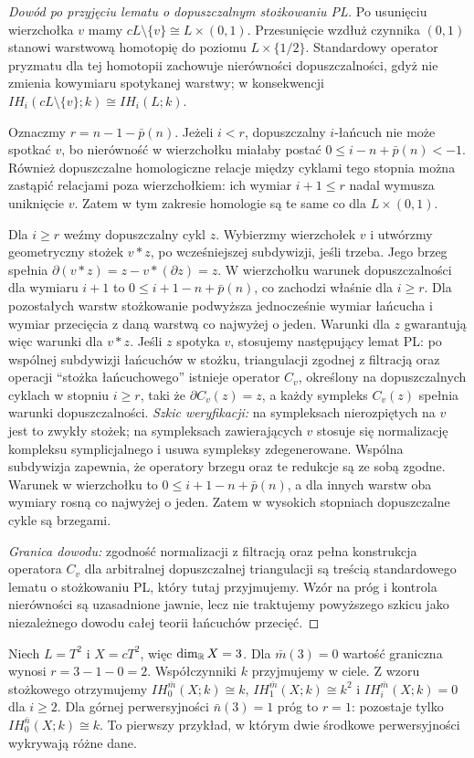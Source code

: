 \begin{proof}[Dowód po przyjęciu lematu o dopuszczalnym stożkowaniu PL]
Po usunięciu wierzchołka $v$ mamy
$cL\setminus\{v\}\cong L\times(0,1)$.
Przesunięcie wzdłuż czynnika $(0,1)$ stanowi
warstwową homotopię do poziomu $L\times\{1/2\}$.
Standardowy operator pryzmatu dla tej homotopii
zachowuje nierówności dopuszczalności, gdyż nie
zmienia kowymiaru spotykanej warstwy; w konsekwencji
$IH_i(cL\setminus\{v\};k)\cong IH_i(L;k)$.

Oznaczmy $r=n-1-\bar p(n)$.
Jeżeli $i<r$, dopuszczalny $i$-łańcuch nie może
spotkać $v$, bo nierówność w wierzchołku miałaby
postać $0\le i-n+\bar p(n)<-1$.
Również dopuszczalne homologiczne relacje między
cyklami tego stopnia można zastąpić relacjami poza
wierzchołkiem: ich wymiar $i+1\le r$ nadal wymusza
uniknięcie $v$. Zatem w tym zakresie homologie są
te same co dla $L\times(0,1)$.

Dla $i\ge r$ weźmy dopuszczalny cykl $z$.
Wybierzmy wierzchołek $v$ i utwórzmy geometryczny
stożek $v*z$, po wcześniejszej subdywizji, jeśli
trzeba. Jego brzeg spełnia
$\partial(v*z)=z-v*(\partial z)=z$.
W wierzchołku warunek dopuszczalności dla wymiaru
$i+1$ to $0\le i+1-n+\bar p(n)$, co zachodzi
właśnie dla $i\ge r$. Dla pozostałych warstw
stożkowanie podwyższa jednocześnie wymiar łańcucha
i wymiar przecięcia z daną warstwą co najwyżej
o jeden. Warunki dla $z$ gwarantują więc warunki
dla $v*z$. Jeśli $z$ spotyka $v$, stosujemy następujący
lemat PL: po wspólnej subdywizji łańcuchów w
stożku, triangulacji zgodnej z filtracją oraz
operacji ``stożka łańcuchowego'' istnieje operator
$C_v$, określony na dopuszczalnych cyklach w
stopniu $i\ge r$, taki że
$\partial C_v(z)=z$, a każdy sympleks $C_v(z)$
spełnia warunki dopuszczalności. \emph{Szkic weryfikacji:}
na sympleksach nierozpiętych na $v$ jest to zwykły
stożek; na sympleksach zawierających $v$ stosuje się
normalizację kompleksu symplicjalnego i usuwa
sympleksy zdegenerowane. Wspólna subdywizja
zapewnia, że operatory brzegu oraz te redukcje
są ze sobą zgodne. Warunek w wierzchołku to
$0\le i+1-n+\bar p(n)$, a dla innych warstw
oba wymiary rosną co najwyżej o jeden.
Zatem w wysokich stopniach dopuszczalne cykle
są brzegami.

\emph{Granica dowodu:} zgodność normalizacji z
filtracją oraz pełna konstrukcja operatora $C_v$
dla arbitralnej dopuszczalnej triangulacji są
treścią standardowego lematu o stożkowaniu PL,
który tutaj przyjmujemy. Wzór na próg i
kontrola nierówności są uzasadnione jawnie,
lecz nie traktujemy powyższego szkicu jako
niezależnego dowodu całej teorii łańcuchów
przecięć.
\end{proof}
\begin{przyklad}
\label{ex:torus-cone-xiii}
Niech $L=T^2$ i $X=cT^2$, więc $\dim_{\mathbb{R}} X=3$.
Dla $\bar m(3)=0$ wartość graniczna wynosi
$r=3-1-0=2$. Współczynniki $k$ przyjmujemy w ciele.
Z wzoru stożkowego otrzymujemy
$IH_0^{\bar m}(X;k)\cong k$,
$IH_1^{\bar m}(X;k)\cong k^2$ i
$IH_i^{\bar m}(X;k)=0$ dla $i\ge2$.
Dla górnej perwersyjności $\bar n(3)=1$ próg to $r=1$:
pozostaje tylko $IH_0^{\bar n}(X;k)\cong k$.
To pierwszy przykład, w którym dwie środkowe
perwersyjności wykrywają różne dane.
\end{przyklad}

